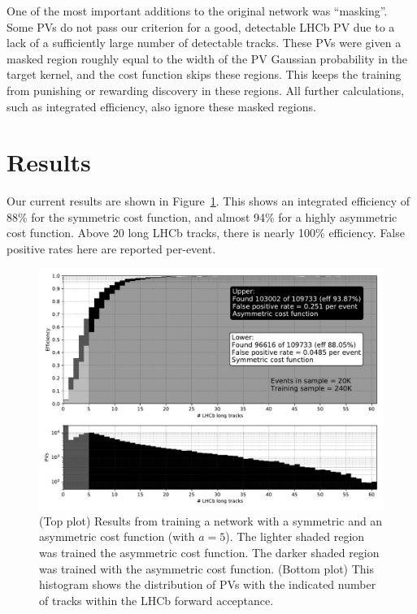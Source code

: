 \documentclass[10pt, paper=a4, UKenglish]{article}
\begin{document}
One of the most important additions to the original network was ``masking''. Some PVs do not pass our criterion for a good, detectable LHCb PV due to a lack of a sufficiently large number of detectable tracks. These PVs were given a masked region roughly equal to the width of the PV Gaussian probability in the target kernel, and the cost function skips these regions. This keeps the training from punishing or rewarding discovery in these regions. All further calculations, such as integrated efficiency, also ignore these masked regions.

\section{Results}

Our current results are shown in Figure~\ref{fig:results}. This shows an integrated efficiency of 88\% for the symmetric cost function, and almost 94\% for a highly asymmetric cost function. Above 20 long LHCb tracks, there is nearly 100\% efficiency. False positive rates here are reported per-event.

\begin{figure}[!htb]
	\centering
	\includegraphics[width=\textwidth]{images/effntrackspaper.pdf}
	\caption{
		(Top plot) Results from training a network with a symmetric and an asymmetric cost function (with $a=5$).
		The lighter shaded region was trained the asymmetric cost function. The darker shaded region was trained with the asymmetric cost function.
		(Bottom plot) This histogram shows the distribution of PVs with the indicated number of tracks within the LHCb forward acceptance.
	}
	\label{fig:results}
\end{figure}
\end{document}
